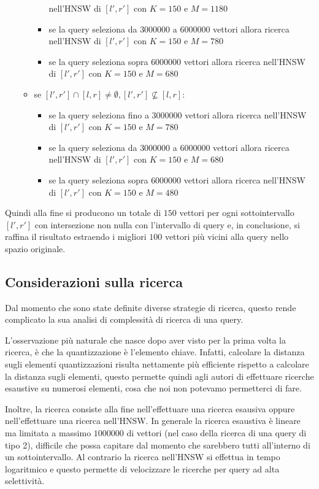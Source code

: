 \begin{itemize}
\begin{itemize}
\begin{itemize}
            nell'HNSW di $[l',r']$ con $K=150$ e $M=1180$
            \item se la query seleziona da $3000000$ a $6000000$ vettori allora ricerca 
            nell'HNSW di $[l',r']$ con $K=150$ e $M=780$
            \item se la query seleziona sopra $6000000$ vettori allora ricerca 
            nell'HNSW di $[l',r']$ con $K=150$ e $M=680$
        \end{itemize}
        \item se $[l',r'] \cap [l,r] \ne \emptyset, [l',r'] \not \subseteq [l,r]$:
        \begin{itemize}
            \item se la query seleziona fino a $3000000$ vettori allora ricerca 
            nell'HNSW di $[l',r']$ con $K=150$ e $M=780$
            \item se la query seleziona da $3000000$ a $6000000$ vettori allora ricerca 
            nell'HNSW di $[l',r']$ con $K=150$ e $M=680$
            \item se la query seleziona sopra $6000000$ vettori allora ricerca 
            nell'HNSW di $[l',r']$ con $K=150$ e $M=480$
        \end{itemize}
    \end{itemize}
\end{itemize}
Quindi alla fine si producono un totale di $150$ vettori per ogni sottointervallo
$[l',r']$ con intersezione non nulla con l'intervallo di query e, in conclusione, 
si raffina il risultato estraendo i migliori $100$ vettori più vicini alla query 
nello spazio originale.   

\subsection{Considerazioni sulla ricerca}

Dal momento che sono state definite diverse strategie di ricerca, questo rende 
complicato la sua analisi di complessità di ricerca di una query.

L'osservazione più naturale che nasce dopo aver visto per la prima volta la ricerca,
è che la quantizzazione è l'elemento chiave. Infatti, calcolare la distanza sugli 
elementi quantizzazioni risulta nettamente più efficiente rispetto a calcolare la 
distanza sugli elementi, questo permette quindi agli autori di effettuare ricerche 
esaustive su numerosi elementi, cosa che noi non potevamo permetterci di fare.

Inoltre, la ricerca consiste alla fine nell'effettuare una ricerca esausiva 
oppure nell'effettuare una ricerca nell'HNSW. In generale la ricerca esaustiva è 
lineare ma limitata a massimo $1000000$ di vettori (nel caso della ricerca di una 
query di tipo 2), difficile che possa capitare dal momento che sarebbero tutti 
all'interno di un sottointervallo. Al contrario la ricerca nell'HNSW si effettua 
in tempo logaritmico e questo permette di velocizzare le ricerche per query ad 
alta selettività. 


